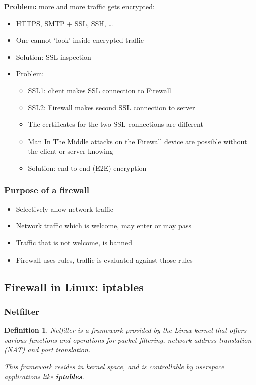 \documentclass{article}
\newtheorem{theorem}{Definition}[section]
\begin{document}
\textbf{Problem:} more and more traffic gets encrypted:

\begin{itemize}
    \item HTTPS, SMTP + SSL, SSH, \dots
    \item One cannot `look' inside encrypted traffic
    \item Solution: SSL-inspection
    \item Problem:
    \begin{itemize}
        \item SSL1: client makes SSL connection to Firewall
        \item SSL2: Firewall makes second SSL connection to server
        \item The certificates for the two SSL connections are different
        \item Man In The Middle attacks on the Firewall device are possible without the client or server knowing
        \item Solution: end-to-end (E2E) encryption
    \end{itemize}
\end{itemize}

\subsubsection{Purpose of a firewall}

\begin{itemize}
    \item Selectively allow network traffic
    \item Network traffic which is welcome, may enter or may pass
    \item Traffic that is not welcome, is banned
    \item Firewall uses rules, traffic is evaluated against those rules
\end{itemize}

\subsection{Firewall in Linux: iptables}

\subsubsection{Netfilter}

\begin{theorem}
    Netfilter is a framework provided by the Linux kernel that offers
    various functions and operations for packet filtering, network 
    address translation (NAT) and port translation. 

    This framework resides in kernel space, and is controllable by
    userspace applications like \textbf{iptables}.
\end{theorem}
\end{document}
